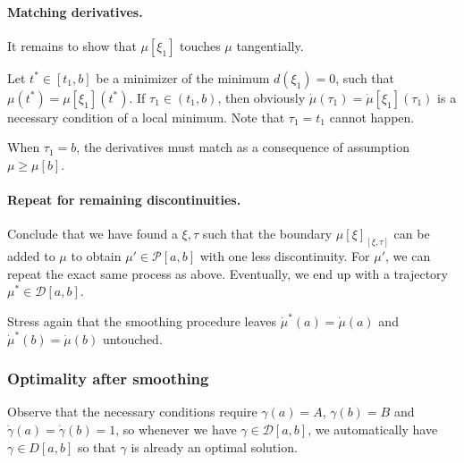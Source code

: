 \documentclass[a4paper]{article}
\theoremstyle{definition}
\theoremstyle{plain}
\begin{document}
\paragraph{Matching derivatives.}
It remains to show that $\mu[\xi_{1}]$ touches $\mu$ tangentially.

\begin{outline}
  \1 Let $t^{*} \in [t_{1}, b]$ be a minimizer of the minimum $d(\xi_{1}) = 0$,
  such that $\mu(t^{*}) = \mu[\xi_{1}](t^{*})$.
  If $\tau_{1} \in (t_{1}, b)$, then obviously
  $\dot{\mu}(\tau_{1}) = \dot{\mu}[\xi_{1}](\tau_{1})$ is a necessary condition
  of a local minimum. Note that $\tau_{1}=t_{1}$ cannot happen.

  \1 When $\tau_{1} = b$, the derivatives must match as a consequence of
  assumption $\mu \geq \mu[b]$.

\end{outline}


\paragraph{Repeat for remaining discontinuities.}

\begin{outline}
  \1 Conclude that we have found a $\xi, \tau$ such that the boundary
  $\mu[\xi]_{[\xi,\tau]}$ can be added to $\mu$ to obtain
  $\mu' \in \mathcal{P}[a,b]$ with one less discontinuity. For $\mu'$, we can
  repeat the exact same process as above. Eventually, we end up with a
  trajectory $\mu^{*} \in \mathcal{D}[a,b]$.

  \1 Stress again that the smoothing procedure leaves
  $\dot{\mu}^{*}(a) = \dot{\mu}(a)$ and $\dot{\mu}^{*}(b) = \dot{\mu}(b)$
  untouched.

\end{outline}


\subsubsection{Optimality after smoothing}


{\color{Navy} Observe that the necessary conditions require $\gamma(a) = A$,
  $\gamma(b) = B$ and $\dot{\gamma}(a) = \dot{\gamma}(b) = 1$, so whenever we
  have $\gamma \in \mathcal{D}[a, b]$, we automatically have $\gamma \in D[a,b]$
  so that $\gamma$ is already an optimal solution. }
\end{document}
